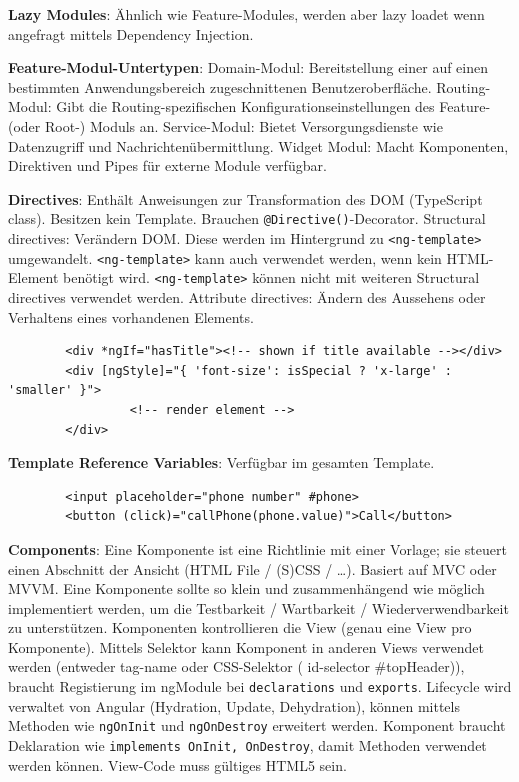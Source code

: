\documentclass[10pt,landscape]{article}
\begin{document}
\begin{multicols}{3}
        \textbf{Lazy Modules}: Ähnlich wie Feature-Modules, werden aber lazy loadet wenn angefragt mittels Dependency Injection.

        \textbf{Feature-Modul-Untertypen}: Domain-Modul: Bereitstellung einer auf einen bestimmten Anwendungsbereich zugeschnittenen Benutzeroberfläche.
        Routing-Modul: Gibt die Routing-spezifischen Konfigurationseinstellungen des Feature- (oder Root-) Moduls an.
        Service-Modul: Bietet Versorgungsdienste wie Datenzugriff und Nachrichtenübermittlung.
        Widget Modul: Macht Komponenten, Direktiven und Pipes für externe Module verfügbar.

        \textbf{Directives}: Enthält Anweisungen zur Transformation des DOM (TypeScript class).
        Besitzen kein Template.
        Brauchen \lstinline{@Directive()}-Decorator.
        Structural directives: Verändern DOM.
        Diese werden im Hintergrund zu \lstinline{<ng-template>} umgewandelt.
        \lstinline{<ng-template>} kann auch verwendet werden, wenn kein HTML-Element benötigt wird.
        \lstinline{<ng-template>} können nicht mit weiteren Structural directives verwendet werden.
        Attribute directives: Ändern des Aussehens oder Verhaltens eines vorhandenen Elements.

        \begin{lstlisting}
        <div *ngIf="hasTitle"><!-- shown if title available --></div>
        <div [ngStyle]="{ 'font-size': isSpecial ? 'x-large' : 'smaller' }">
                 <!-- render element -->
        </div>
        \end{lstlisting}

        \textbf{Template Reference Variables}: Verfügbar im gesamten Template.

        \begin{lstlisting}
        <input placeholder="phone number" #phone>
        <button (click)="callPhone(phone.value)">Call</button>
        \end{lstlisting}

        \textbf{Components}: Eine Komponente ist eine Richtlinie mit einer Vorlage; sie steuert einen Abschnitt der Ansicht (HTML File / (S)CSS / \ldots).
        Basiert auf MVC oder MVVM.
        Eine Komponente sollte so klein und zusammenhängend wie möglich implementiert werden, um die Testbarkeit / Wartbarkeit / Wiederverwendbarkeit zu unterstützen.
        Komponenten kontrollieren die View (genau eine View pro Komponente).
        Mittels Selektor kann Komponent in anderen Views verwendet werden (entweder tag-name oder CSS-Selektor ( id-selector \#topHeader)), braucht Registierung im ngModule bei \lstinline{declarations} und \lstinline{exports}.
        Lifecycle wird verwaltet von Angular (Hydration, Update, Dehydration), können mittels Methoden wie \lstinline{ngOnInit} und \lstinline{ngOnDestroy} erweitert werden.
        Komponent braucht Deklaration wie \lstinline{implements OnInit, OnDestroy}, damit Methoden verwendet werden können.
        View-Code muss gültiges HTML5 sein.


\end{multicols}
\end{document}
